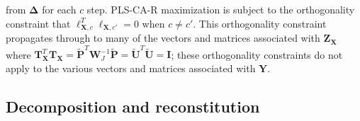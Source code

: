 \documentclass[12pt]{article}
\begin{document}
from \({\mathbf \Delta}\) for each \(c\) step. PLS-CA-R maximization is
subject to the orthogonality constraint that
\({\boldsymbol \ell}_{{\mathbf X},c}^{T}{\boldsymbol \ell}_{{\mathbf X},c'} = 0\)
when \(c \neq c'\). This orthogonality constraint propagates through to
many of the vectors and matrices associated with
\({\mathbf Z}_{\mathbf X}\) where
\({\mathbf T}_{\mathbf X}^{T}{\mathbf T}_{\mathbf X} = \widetilde{\mathbf P}^{T}{\mathbf W}_{J}^{-1}\widetilde{\mathbf P} = \widetilde{\mathbf U}^{T}\widetilde{\mathbf U} = {\mathbf I}\);
these orthogonality constraints do not apply to the various vectors and
matrices associated with \({\mathbf Y}\).

\hypertarget{decomposition-and-reconstitution}{%
\subsection{Decomposition and
reconstitution}\label{decomposition-and-reconstitution}}

\label{section:recresp}
\end{document}
